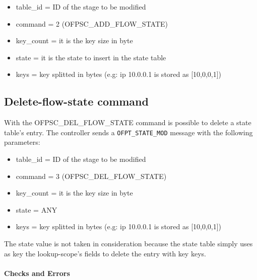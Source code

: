 \begin{itemize}
\item table\_id = ID of the stage to be modified
\item command = 2 (OFPSC\_ADD\_FLOW\_STATE)
\item key\_count = it is the key size in byte
\item state = it is the state to insert in the state table
\item keys = key splitted in bytes (e.g: ip 10.0.0.1 is stored as [10,0,0,1])
\end{itemize}



\subsection{Delete-flow-state command}
\label{subsec:del_flow}

With the OFPSC\_DEL\_FLOW\_STATE command is possible to delete a state table's entry.
The controller sends a \texttt{OFPT\_STATE\_MOD} message with the following parameters:

\begin{itemize}
\item table\_id = ID of the stage to be modified
\item command = 3 (OFPSC\_DEL\_FLOW\_STATE)
\item key\_count = it is the key size in byte
\item state = ANY
\item keys = key splitted in bytes (e.g: ip 10.0.0.1 is stored as [10,0,0,1])
\end{itemize}


The state value is not taken in consideration because the state table simply uses as key the lookup-scope's fields to delete the entry with key keys.

\paragraph{Checks and Errors}

